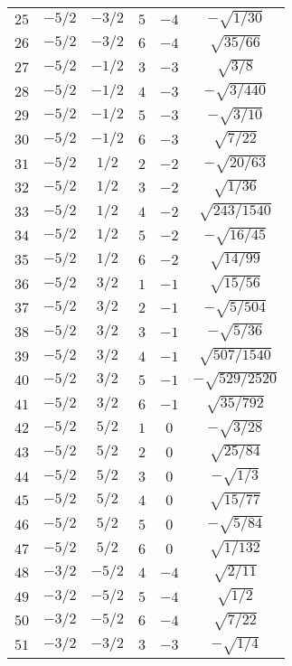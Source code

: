 \begin{table}
\begin{center}
\begin{tabular}{|c|c|c|c|c|c|}
$25$ & $-5/2$ & $-3/2$ & $5$ & $-4$ & $-\sqrt{1/30}$ \\ 
$26$ & $-5/2$ & $-3/2$ & $6$ & $-4$ & $\sqrt{35/66}$ \\ 
$27$ & $-5/2$ & $-1/2$ & $3$ & $-3$ & $\sqrt{3/8}$ \\ 
$28$ & $-5/2$ & $-1/2$ & $4$ & $-3$ & $-\sqrt{3/440}$ \\ 
$29$ & $-5/2$ & $-1/2$ & $5$ & $-3$ & $-\sqrt{3/10}$ \\ 
$30$ & $-5/2$ & $-1/2$ & $6$ & $-3$ & $\sqrt{7/22}$ \\ 
$31$ & $-5/2$ & $1/2$ & $2$ & $-2$ & $-\sqrt{20/63}$ \\ 
$32$ & $-5/2$ & $1/2$ & $3$ & $-2$ & $\sqrt{1/36}$ \\ 
$33$ & $-5/2$ & $1/2$ & $4$ & $-2$ & $\sqrt{243/1540}$ \\ 
$34$ & $-5/2$ & $1/2$ & $5$ & $-2$ & $-\sqrt{16/45}$ \\ 
$35$ & $-5/2$ & $1/2$ & $6$ & $-2$ & $\sqrt{14/99}$ \\ 
$36$ & $-5/2$ & $3/2$ & $1$ & $-1$ & $\sqrt{15/56}$ \\ 
$37$ & $-5/2$ & $3/2$ & $2$ & $-1$ & $-\sqrt{5/504}$ \\ 
$38$ & $-5/2$ & $3/2$ & $3$ & $-1$ & $-\sqrt{5/36}$ \\ 
$39$ & $-5/2$ & $3/2$ & $4$ & $-1$ & $\sqrt{507/1540}$ \\ 
$40$ & $-5/2$ & $3/2$ & $5$ & $-1$ & $-\sqrt{529/2520}$ \\ 
$41$ & $-5/2$ & $3/2$ & $6$ & $-1$ & $\sqrt{35/792}$ \\ 
$42$ & $-5/2$ & $5/2$ & $1$ & $0$ & $-\sqrt{3/28}$ \\ 
$43$ & $-5/2$ & $5/2$ & $2$ & $0$ & $\sqrt{25/84}$ \\ 
$44$ & $-5/2$ & $5/2$ & $3$ & $0$ & $-\sqrt{1/3}$ \\ 
$45$ & $-5/2$ & $5/2$ & $4$ & $0$ & $\sqrt{15/77}$ \\ 
$46$ & $-5/2$ & $5/2$ & $5$ & $0$ & $-\sqrt{5/84}$ \\ 
$47$ & $-5/2$ & $5/2$ & $6$ & $0$ & $\sqrt{1/132}$ \\ 
$48$ & $-3/2$ & $-5/2$ & $4$ & $-4$ & $\sqrt{2/11}$ \\ 
$49$ & $-3/2$ & $-5/2$ & $5$ & $-4$ & $\sqrt{1/2}$ \\ 
$50$ & $-3/2$ & $-5/2$ & $6$ & $-4$ & $\sqrt{7/22}$ \\ 
$51$ & $-3/2$ & $-3/2$ & $3$ & $-3$ & $-\sqrt{1/4}$ \\ 

\end{tabular}
\end{center}
\end{table}
